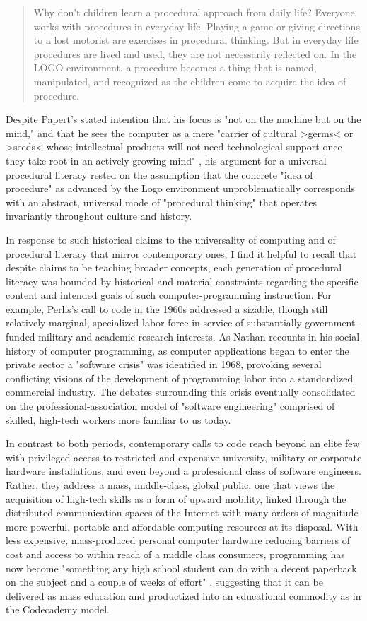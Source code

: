 \blockcquote[154]{Papert80}{
  Why don't children learn a procedural approach from daily life? Everyone works with procedures in everyday life. Playing a game or giving directions to a lost motorist are exercises in procedural thinking. But in everyday life procedures are lived and used, they are not necessarily reflected on. In the LOGO environment, a procedure becomes a thing that is named, manipulated, and recognized as the children come to acquire the idea of procedure.
}
Despite Papert's stated intention that his focus is "not on the machine but on the mind," and that he sees the computer as a mere "carrier of cultural >germs< or >seeds< whose intellectual products will not need technological support once they take root in an actively growing mind" \autocite[9]{Papert80}, his argument for a universal procedural literacy rested on the assumption that the concrete "idea of procedure" as advanced by the Logo environment unproblematically corresponds with an abstract, universal mode of "procedural thinking" that operates invariantly throughout culture and history.

In response to such historical claims to the universality of computing and of procedural literacy that mirror contemporary ones, I find it helpful to recall that despite claims to be teaching broader concepts, each generation of procedural literacy was bounded by historical and material constraints regarding the specific content and intended goals of such computer-programming instruction. For example, Perlis's call to code in the 1960s addressed a sizable, though still relatively marginal, specialized labor force in service of substantially government-funded military and academic research interests. As Nathan \citeauthor{Ensmenger2010} recounts in his social history of computer programming, as computer applications began to enter the private sector a "software crisis" was identified in 1968, provoking several conflicting visions of the development of programming labor into a standardized commercial industry. The debates surrounding this crisis eventually consolidated on the professional-association model of "software engineering" comprised of skilled, high-tech workers more familiar to us today.

In contrast to both periods, contemporary calls to code reach beyond an elite few with privileged access to restricted and expensive university, military or corporate hardware installations, and even beyond a professional class of software engineers. Rather, they address a mass, middle-class, global public, one that views the acquisition of high-tech skills as a form of upward mobility, linked through the distributed communication spaces of the Internet with many orders of magnitude more powerful, portable and affordable computing resources at its disposal. With less expensive, mass-produced personal computer hardware reducing barriers of cost and access to within reach of a middle class consumers, programming has now become "something any high school student can do with a decent paperback on the subject and a couple of weeks of effort" \autocite[143]{Rushkoff2010}, suggesting that it can be delivered as mass education and productized into an educational commodity as in the Codecademy model.

